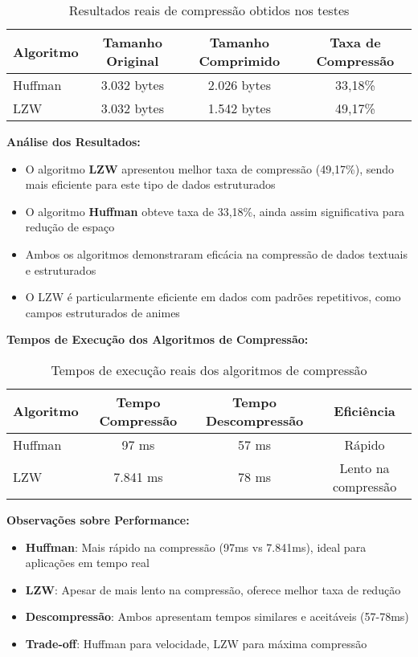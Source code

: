 \documentclass[12pt,a4paper]{article}
\begin{document}
\begin{table}[H]
\centering
\begin{tabular}{@{}lccc@{}}
\toprule
\textbf{Algoritmo} & \textbf{Tamanho Original} & \textbf{Tamanho Comprimido} & \textbf{Taxa de Compressão} \\
\midrule
Huffman & 3.032 bytes & 2.026 bytes & 33,18\% \\
LZW & 3.032 bytes & 1.542 bytes & 49,17\% \\
\bottomrule
\end{tabular}
\caption{Resultados reais de compressão obtidos nos testes}
\end{table}

\textbf{Análise dos Resultados:}
\begin{itemize}
    \item O algoritmo \textbf{LZW} apresentou melhor taxa de compressão (49,17\%), sendo mais eficiente para este tipo de dados estruturados
    \item O algoritmo \textbf{Huffman} obteve taxa de 33,18\%, ainda assim significativa para redução de espaço
    \item Ambos os algoritmos demonstraram eficácia na compressão de dados textuais e estruturados
    \item O LZW é particularmente eficiente em dados com padrões repetitivos, como campos estruturados de animes
\end{itemize}

\textbf{Tempos de Execução dos Algoritmos de Compressão:}

\begin{table}[H]
\centering
\begin{tabular}{@{}lccc@{}}
\toprule
\textbf{Algoritmo} & \textbf{Tempo Compressão} & \textbf{Tempo Descompressão} & \textbf{Eficiência} \\
\midrule
Huffman & 97 ms & 57 ms & Rápido \\
LZW & 7.841 ms & 78 ms & Lento na compressão \\
\bottomrule
\end{tabular}
\caption{Tempos de execução reais dos algoritmos de compressão}
\end{table}

\textbf{Observações sobre Performance:}
\begin{itemize}
    \item \textbf{Huffman}: Mais rápido na compressão (97ms vs 7.841ms), ideal para aplicações em tempo real
    \item \textbf{LZW}: Apesar de mais lento na compressão, oferece melhor taxa de redução
    \item \textbf{Descompressão}: Ambos apresentam tempos similares e aceitáveis (57-78ms)
    \item \textbf{Trade-off}: Huffman para velocidade, LZW para máxima compressão
\end{itemize}
\end{document}

